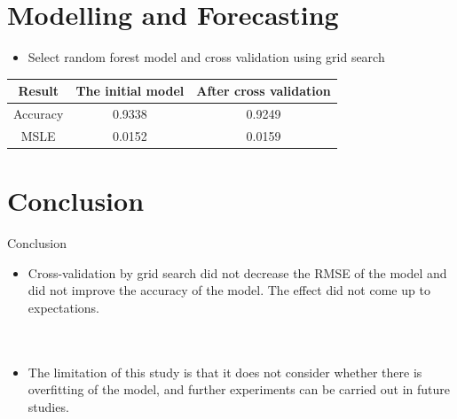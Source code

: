 \documentclass[
 size=14pt,
 paper=smartboard,  %
 mode=present, 		%
 display=slides, 	%
 style=tuliplab,  	%
 pauseslide,
 fleqn,leqno]{powerdot}
\begin{document}
\section{Modelling and Forecasting}


\begin{slide}{}
  
\begin{itemize}
\item
Select random forest model and cross validation using grid search
  
\end{itemize} 
\vspace{1.5cm}
\begin{tabular}{ c | c | c  }
\toprule
Result     &  The initial model    & After cross validation       \\
\midrule
Accuracy       &  0.9338   &  0.9249       \\
  
MSLE      &  0.0152   &  0.0159     \\
  
\bottomrule       
\end{tabular}



  
  
  
\end{slide}
      


\section{Conclusion}


\begin{slide}[toc=,bm=]{Conclusion}

\begin{center}
\begin{itemize}

\item
Cross-validation by grid search did not decrease the RMSE of the model and did not improve the accuracy of the model.
The effect did not come up to expectations.
\\
\\
\\

\item
The limitation of this study is that it does not consider whether there is overfitting of the model, and further experiments can be carried out in future studies.

\end{itemize}
\end{center}


\end{slide}
\end{document}
